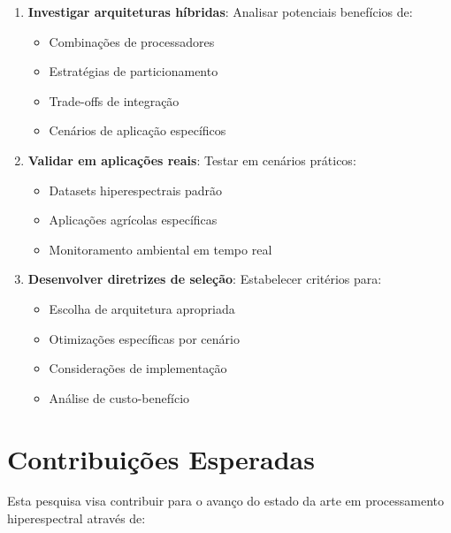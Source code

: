 \begin{enumerate}
    \item \textbf{Investigar arquiteturas híbridas}: Analisar potenciais benefícios de:
    \begin{itemize}
        \item Combinações de processadores
        \item Estratégias de particionamento
        \item Trade-offs de integração
        \item Cenários de aplicação específicos
    \end{itemize}
    
    \item \textbf{Validar em aplicações reais}: Testar em cenários práticos:
    \begin{itemize}
        \item Datasets hiperespectrais padrão
        \item Aplicações agrícolas específicas
        \item Monitoramento ambiental em tempo real
    \end{itemize}
    
    \item \textbf{Desenvolver diretrizes de seleção}: Estabelecer critérios para:
    \begin{itemize}
        \item Escolha de arquitetura apropriada
        \item Otimizações específicas por cenário
        \item Considerações de implementação
        \item Análise de custo-benefício
    \end{itemize}
\end{enumerate}

\section{Contribuições Esperadas}\label{sec:contribuicoes}

Esta pesquisa visa contribuir para o avanço do estado da arte em processamento hiperespectral através de:

